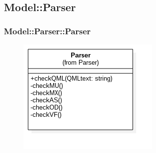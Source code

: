 \subsection{Model::Parser}
\subsubsection{Model::Parser::Parser}
\begin{figure}[h!]
\begin{center}
	\includegraphics[scale=0.4]{../images/Model/Parser/Parser.png}
\end{center}
\end{figure}
